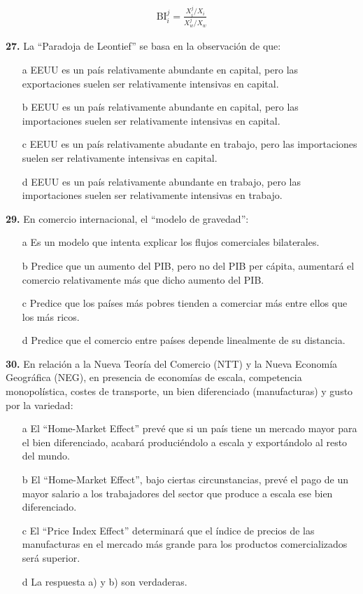 \documentclass{nuevotema}
\begin{document}
\begin{align*}
\text{BI}_i^j = \frac{X_i^j / X_i}{X_w^j / X_w}
\end{align*}


\preguntas

\textbf{27.} La ``Paradoja de Leontief'' se basa en la observación de que:

\begin{itemize}
	\item[a] EEUU es un país relativamente abundante en capital, pero las exportaciones suelen ser relativamente intensivas en capital.
	\item[b] EEUU es un país relativamente abundante en capital, pero las importaciones suelen ser relativamente intensivas en capital.
	\item[c] EEUU es un país relativamente abudante en trabajo, pero las importaciones suelen ser relativamente intensivas en capital.
	\item[d] EEUU es un país relativamente abundante en trabajo, pero las importaciones suelen ser relativamente intensivas en trabajo.
\end{itemize}

\textbf{29.} En comercio internacional, el ``modelo de gravedad'':

\begin{itemize}
	\item[a] Es un modelo que intenta explicar los flujos comerciales bilaterales.
	\item[b] Predice que un aumento del PIB, pero no del PIB per cápita, aumentará el comercio relativamente más que dicho aumento del PIB.
	\item[c] Predice que los países más pobres tienden a comerciar más entre ellos que los más ricos.
	\item[d] Predice que el comercio entre países depende linealmente de su distancia.
\end{itemize}


\textbf{30.} En relación a la Nueva Teoría del Comercio (NTT) y la Nueva Economía Geográfica (NEG), en presencia de economías de escala, competencia monopolística, costes de transporte, un bien diferenciado (manufacturas) y gusto por la variedad:

\begin{itemize}
	\item[a] El ``Home-Market Effect'' prevé que si un país tiene un mercado mayor para el bien diferenciado, acabará produciéndolo a escala y exportándolo al resto del mundo.
	\item[b] El ``Home-Market Effect'', bajo ciertas circunstancias, prevé el pago de un mayor salario a los trabajadores del sector que produce a escala ese bien diferenciado.
	\item[c] El ``Price Index Effect'' determinará que el índice de precios de las manufacturas en el mercado más grande para los productos comercializados será superior.
	\item[d] La respuesta a) y b) son verdaderas.
\end{itemize}
\end{document}
